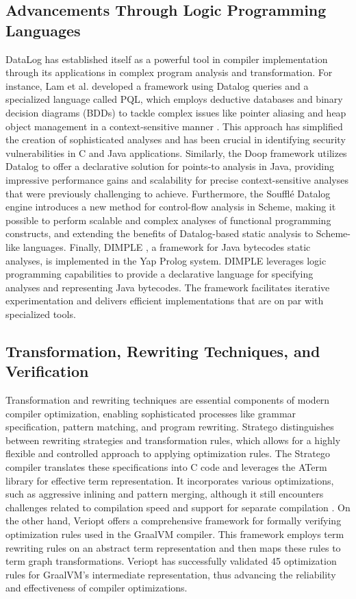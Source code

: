 \subsection{Advancements Through Logic Programming Languages}
DataLog has established itself as a powerful tool in compiler implementation through its applications in complex program analysis and transformation. For instance, Lam et al. developed a framework using Datalog queries and a specialized language called PQL, which employs deductive databases and binary decision diagrams (BDDs) to tackle complex issues like pointer aliasing and heap object management in a context-sensitive manner \cite{Lam2005}. This approach has simplified the creation of sophisticated analyses and has been crucial in identifying security vulnerabilities in C and Java applications. Similarly, the Doop framework \cite{Bravenboer2009} utilizes Datalog to offer a declarative solution for points-to analysis in Java, providing impressive performance gains and scalability for precise context-sensitive analyses that were previously challenging to achieve. Furthermore, the Soufflé Datalog engine \cite{silverman2021wantanalyzeschemeprograms} introduces a new method for control-flow analysis in Scheme, making it possible to perform scalable and complex analyses of functional programming constructs, and extending the benefits of Datalog-based static analysis to Scheme-like languages. Finally, DIMPLE \cite{Benton2007}, a framework for Java bytecodes static analyses, is implemented in the Yap Prolog system. DIMPLE leverages logic programming capabilities to provide a declarative language for specifying analyses and representing Java bytecodes. The framework facilitates iterative experimentation and delivers efficient implementations that are on par with specialized tools.

\subsection{Transformation, Rewriting Techniques, and Verification}
Transformation and rewriting techniques are essential components of modern compiler optimization, enabling sophisticated processes like grammar specification, pattern matching, and program rewriting. Stratego \cite{Eelco2001} distinguishes between rewriting strategies and transformation rules, which allows for a highly flexible and controlled approach to applying optimization rules. The Stratego compiler translates these specifications into C code and leverages the ATerm library for effective term representation. It incorporates various optimizations, such as aggressive inlining and pattern merging, although it still encounters challenges related to compilation speed and support for separate compilation \cite{Eelco2001}. On the other hand, Veriopt \cite{Webb2023} offers a comprehensive framework for formally verifying optimization rules used in the GraalVM compiler. This framework employs term rewriting rules on an abstract term representation and then maps these rules to term graph transformations. Veriopt has successfully validated 45 optimization rules for GraalVM’s intermediate representation, thus advancing the reliability and effectiveness of compiler optimizations.

